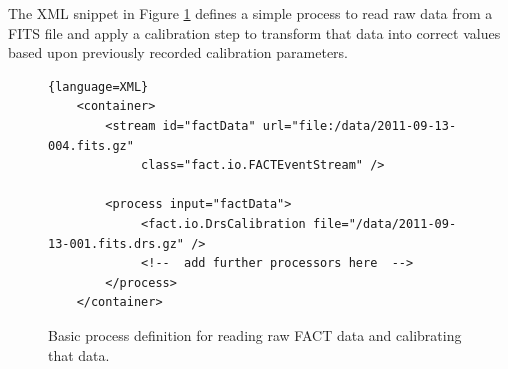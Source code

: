 The XML snippet in Figure \ref{fig:readFACTxml} defines a simple process to
read raw data from a FITS file and apply a calibration step to transform that
data into correct values based upon previously recorded calibration parameters.

\begin{figure}[h!]
\begin{lstlisting}{language=XML}
    <container>
        <stream id="factData" url="file:/data/2011-09-13-004.fits.gz"
             class="fact.io.FACTEventStream" />

        <process input="factData">
             <fact.io.DrsCalibration file="/data/2011-09-13-001.fits.drs.gz" />
             <!--  add further processors here  -->
        </process>
    </container>
\end{lstlisting}
\caption{\label{fig:readFACTxml}Basic process definition for reading raw FACT data
and calibrating that data.}
\end{figure}

